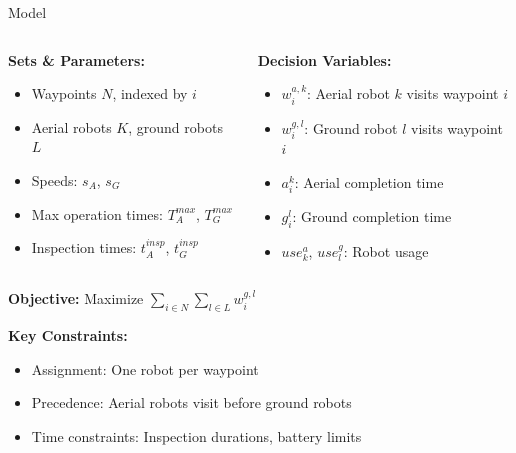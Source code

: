 \documentclass[11pt,xcolor={dvipsnames},hyperref={pdftex,pdfpagemode=UseNone,hidelinks,pdfdisplaydoctitle=true},usepdftitle=false]{beamer}
\begin{document}
    \begin{frame}{Model}
      \begin{columns}
        \begin{column}{0.5\textwidth}
          \textbf{Sets \& Parameters:}
          \begin{itemize}
            \item Waypoints $N$, indexed by $i$
            \item Aerial robots $K$, ground robots $L$
            \item Speeds: $s_A$, $s_G$
            \item Max operation times: $T_A^{max}$, $T_G^{max}$
            \item Inspection times: $t_A^{insp}$, $t_G^{insp}$
          \end{itemize}
        \end{column}
        \begin{column}{0.5\textwidth}
          \textbf{Decision Variables:}
          \begin{itemize}
            \item $w_i^{a,k}$: Aerial robot $k$ visits waypoint $i$
            \item $w_i^{g,l}$: Ground robot $l$ visits waypoint $i$
            \item $a_i^k$: Aerial completion time
            \item $g_i^l$: Ground completion time
            \item $use_k^a$, $use_l^g$: Robot usage
          \end{itemize}
        \end{column}
      \end{columns}
      \vspace{0.5cm}
      \textbf{Objective:} Maximize $\sum_{i \in N}\sum_{l \in L} w_i^{g,l}$
      \vspace{0.3cm}
      
      \textbf{Key Constraints:}
      \begin{itemize}
        \item Assignment: One robot per waypoint 
        \item Precedence: Aerial robots visit before ground robots
        \item Time constraints: Inspection durations, battery limits
      \end{itemize}
    \end{frame}
\end{document}
